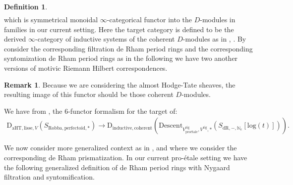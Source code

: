 \documentclass[12pt]{article}
\theoremstyle{definition}
\newtheorem{remark}{Remark}
\newtheorem{definition}{Definition}
\begin{document}
\begin{definition}
\begin{align}
\end{align}
which is symmetrical monoidal $\infty$-categorical functor into the $D$-modules in families in our current setting. Here the target category is defined to be the derived $\infty$-category of inductive systems of the coherent $D$-modules as in \cite{5GR1}, \cite{5GR2}. By consider the corresponding filtration de Rham period rings and the corresponding syntomization de Rham period rings as in the following we have two another versions of motivic Riemann Hilbert correspondences.
\end{definition}




\begin{remark}
Because we are considering the almost Hodge-Tate sheaves, the resulting image of this functor should be those coherent $D$-modules.
\end{remark}



We have from \cite{5GR1}, \cite{5GR2} the 6-functor formalism for the target of:
\begin{align}
\mathrm{D}_{\mathrm{aHT},\mathrm{lisse},V}(S_{\mathrm{Robba},\mathrm{perfectoid},*})\longrightarrow \mathrm{D}_{\mathrm{inductive},\mathrm{coherent}}(\mathrm{Descent}_{V^\mathrm{rig}_\text{pro\'etale},V^\mathrm{rig},*}(S_{\mathrm{dR},-,\mathbb{N}_c}[\mathrm{log}(t)])).
\end{align}

\indent We now consider more generalized context as in \cite{5BS1}, \cite{5BLC} and \cite{5D} where we consider the corresponding de Rham prismatization. In our current pro-\'etale setting we have the following generalized definition of de Rham period rings with Nygaard filtration and syntomification.
\end{document}
